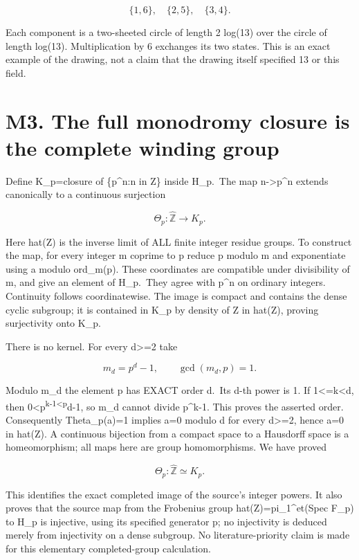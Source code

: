 \[
\{1,6\},\quad\{2,5\},\quad\{3,4\}.
\tag{M2.6}
\]

Each component is a two-sheeted circle of length 2 log(13) over the
circle of length log(13). Multiplication by 6 exchanges its two states.
This is an exact example of the drawing, not a claim that the drawing
itself specified 13 or this field.

\section{M3. The full monodromy closure is the complete winding
group}\label{m3.-the-full-monodromy-closure-is-the-complete-winding-group}

Define K\_p=closure of \{p\^{}n:n in Z\} inside H\_p.~The map
n-\textgreater p\^{}n extends canonically to a continuous surjection

\[
\Theta_p:\widehat{\mathbb Z}\longrightarrow K_p.
\tag{M3.1}
\]

Here hat(Z) is the inverse limit of ALL finite integer residue groups.
To construct the map, for every integer m coprime to p reduce p modulo m
and exponentiate using a modulo ord\_m(p). These coordinates are
compatible under divisibility of m, and give an element of H\_p.~They
agree with p\^{}n on ordinary integers. Continuity follows
coordinatewise. The image is compact and contains the dense cyclic
subgroup; it is contained in K\_p by density of Z in hat(Z), proving
surjectivity onto K\_p.

There is no kernel. For every d\textgreater=2 take

\[
m_d=p^d-1,\qquad \gcd(m_d,p)=1.
\tag{M3.2}
\]

Modulo m\_d the element p has EXACT order d.~Its d-th power is 1. If
1\textless=k\textless d, then
0\textless p\textsuperscript{k-1\textless p}d-1, so m\_d cannot divide
p\^{}k-1. This proves the asserted order. Consequently Theta\_p(a)=1
implies a=0 modulo d for every d\textgreater=2, hence a=0 in hat(Z). A
continuous bijection from a compact space to a Hausdorff space is a
homeomorphism; all maps here are group homomorphisms. We have proved

\[
\boxed{\Theta_p:\widehat{\mathbb Z}\simeq K_p.}
\tag{M3.3}
\]

This identifies the exact completed image of the source's integer
powers. It also proves that the source map from the Frobenius group
hat(Z)=pi\_1\^{}et(Spec F\_p) to H\_p is injective, using its specified
generator p; no injectivity is deduced merely from injectivity on a
dense subgroup. No literature-priority claim is made for this elementary
completed-group calculation.


